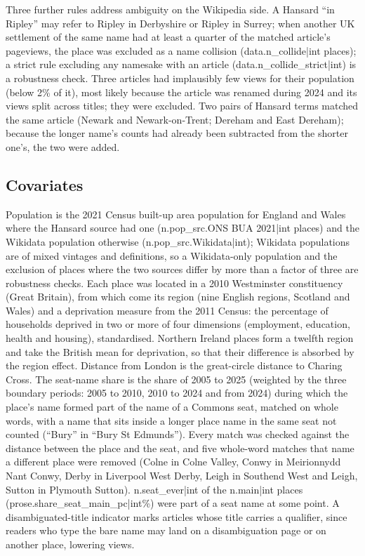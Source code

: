 \documentclass[11pt,a4paper]{article}
\begin{document}
Three further rules address ambiguity on the Wikipedia side. A Hansard ``in Ripley'' may refer to Ripley in Derbyshire or Ripley in Surrey; when another UK settlement of the same name had at least a quarter of the matched article's pageviews, the place was excluded as a name collision ({{data.n_collide|int}} places); a strict rule excluding any namesake with an article ({{data.n_collide_strict|int}}) is a robustness check. Three articles had implausibly few views for their population (below 2\% of it), most likely because the article was renamed during 2024 and its views split across titles; they were excluded. Two pairs of Hansard terms matched the same article (Newark and Newark-on-Trent; Dereham and East Dereham); because the longer name's counts had already been subtracted from the shorter one's, the two were added.

\subsection{Covariates}
Population is the 2021 Census built-up area population for England and Wales where the Hansard source had one ({{n.pop_src.ONS BUA 2021|int}} places) and the Wikidata population otherwise ({{n.pop_src.Wikidata|int}}); Wikidata populations are of mixed vintages and definitions, so a Wikidata-only population and the exclusion of places where the two sources differ by more than a factor of three are robustness checks. Each place was located in a 2010 Westminster constituency (Great Britain), from which come its region (nine English regions, Scotland and Wales) and a deprivation measure from the 2011 Census: the percentage of households deprived in two or more of four dimensions (employment, education, health and housing), standardised. Northern Ireland places form a twelfth region and take the British mean for deprivation, so that their difference is absorbed by the region effect. Distance from London is the great-circle distance to Charing Cross. The seat-name share is the share of 2005 to 2025 (weighted by the three boundary periods: 2005 to 2010, 2010 to 2024 and from 2024) during which the place's name formed part of the name of a Commons seat, matched on whole words, with a name that sits inside a longer place name in the same seat not counted (``Bury'' in ``Bury St Edmunds''). Every match was checked against the distance between the place and the seat, and five whole-word matches that name a different place were removed (Colne in Colne Valley, Conwy in Meirionnydd Nant Conwy, Derby in Liverpool West Derby, Leigh in Southend West and Leigh, Sutton in Plymouth Sutton). {{n.seat_ever|int}} of the {{n.main|int}} places ({{prose.share_seat_main_pc|int}}\%) were part of a seat name at some point. A disambiguated-title indicator marks articles whose title carries a qualifier, since readers who type the bare name may land on a disambiguation page or on another place, lowering views.
\end{document}
